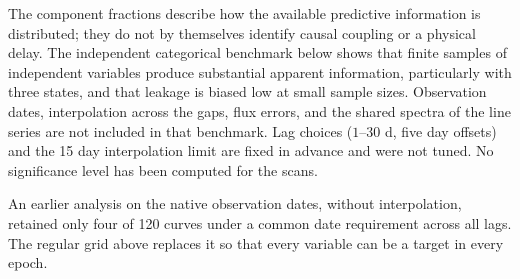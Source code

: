 The component fractions describe how the available predictive information is
distributed; they do not by themselves identify causal coupling or a physical delay.
The independent categorical benchmark below shows that finite samples of
independent variables produce substantial apparent information, particularly with
three states, and that leakage is biased low at small sample sizes. Observation
dates, interpolation across the gaps, flux errors, and the shared spectra of the
line series are not included in that benchmark. Lag choices ($1$--$30$ d, five day
offsets) and the 15 day interpolation limit are fixed in advance and were not
tuned. No significance level has been computed for the scans.

\begin{SURDtable}
\centering
\caption{Median joint information $I$ in bits and normalized leakage $\ell$ for
independent categorical variables (200 draws per setting). The exact values are $I=0$
and $\ell=1$. These are not significance thresholds for the AGN data.}
\label{tab:ep_calibration}
\small

\end{SURDtable}

An earlier analysis on the native observation dates, without interpolation,
retained only four of 120 curves under a common date requirement across all lags.
The regular grid above replaces it so that every variable can be a target in every
epoch.

\clearpage
